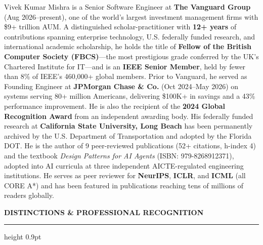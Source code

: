 \documentclass[10pt, letterpaper]{article}
\newcommand{\sect}[1]{%
  \vspace{7pt}%
  {\small\bfseries\color{navy}\MakeUppercase{#1}}%
  \vspace{1pt}%
  {\color{rulegray}\hrule height 0.9pt}%
  \vspace{4pt}%
}
\begin{document}
{\small\color{bodytext}
Vivek Kumar Mishra is a Senior Software Engineer at \textbf{The Vanguard Group} (Aug 2026--present),
one of the world's largest investment management firms with \$9+ trillion AUM. A distinguished
scholar-practitioner with \textbf{12+ years} of contributions spanning enterprise technology, U.S.
federally funded research, and international academic scholarship, he holds the title of
\textbf{Fellow of the British Computer Society (FBCS)}---the most prestigious grade conferred
by the UK's Chartered Institute for IT---and is an \textbf{IEEE Senior Member}, held by fewer
than 8\% of IEEE's 460,000+ global members. Prior to Vanguard, he served as Founding Engineer
at \textbf{JPMorgan Chase \& Co.} (Oct 2024--May 2026) on systems serving 80+ million Americans,
delivering \$100K+ in savings and a 43\% performance improvement. He is also the recipient of the
\textbf{2024 Global Recognition Award} from an independent awarding body. His federally funded research at \textbf{California State
University, Long Beach} has been permanently archived by the U.S. Department of Transportation
and adopted by the Florida DOT. He is the author of 9 peer-reviewed publications (52+ citations,
h-index 4) and the textbook \textit{Design Patterns for AI Agents} (ISBN: 979-8268912371),
adopted into AI curricula at three independent AICTE-regulated engineering institutions.
He serves as peer reviewer for \textbf{NeurIPS}, \textbf{ICLR}, and \textbf{ICML} (all CORE
A*) and has been featured in publications reaching tens of millions of readers globally.
}

\sect{Distinctions \& Professional Recognition}
\end{document}
